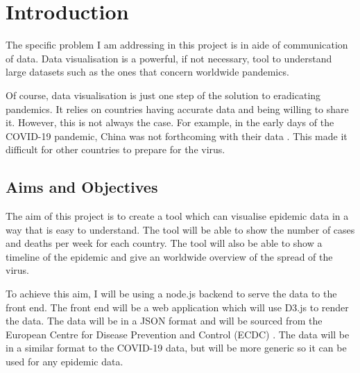 \documentclass{report}
\begin{document}
\chapter{Introduction}
The specific problem I am addressing in this project is in aide of communication of data. Data visualisation is a powerful, if not necessary, tool to understand large datasets such as the ones that concern worldwide pandemics.

Of course, data visualisation is just one step of the solution to eradicating pandemics. It relies on countries having accurate data and being willing to share it. However, this is not always the case. For example, in the early days of the COVID-19 pandemic, China was not forthcoming with their data \cite{chinawrongdata:2019}. This made it difficult for other countries to prepare for the virus.

\section{Aims and Objectives}
The aim of this project is to create a tool which can visualise epidemic data in a way that is easy to understand. The tool will be able to show the number of cases and deaths per week for each country. The tool will also be able to show a timeline of the epidemic and give an worldwide overview of the spread of the virus.

To achieve this aim, I will be using a node.js backend to serve the data to the front end. The front end will be a web application which will use D3.js to render the data. The data will be in a JSON format and will be sourced from the European Centre for Disease Prevention and Control (ECDC) \cite{ecdc}. The data will be in a similar format to the COVID-19 data, but will be more generic so it can be used for any epidemic data.
\end{document}
